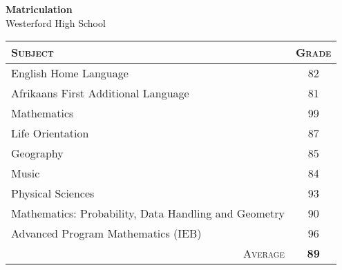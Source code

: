 

\begin{table}[h!]
\centering
\par{\Large \hypertarget{matgrds}{\textbf{Matriculation}\\ \large Westerford High School}\par\bigskip}\normalsize
\begin{tabular}{lc}
\multicolumn{1}{l}{\textsc{Subject}} & \textsc{Grade}\\ \hline
English Home Language                                & 82\\
Afrikaans First Additional Language                  & 81\\
Mathematics                                          & 99\\
Life Orientation                                     & 87\\
Geography                                            & 85\\
Music                                                & 84\\
Physical Sciences                                    & 93\\
Mathematics: Probability, Data Handling and Geometry & 90 \\
Advanced Program Mathematics (IEB)                   & 96\\\hline
\multicolumn{1}{r}{\textsc{Average}}                 & \textbf{89}\\
\end{tabular}
\end{table}

